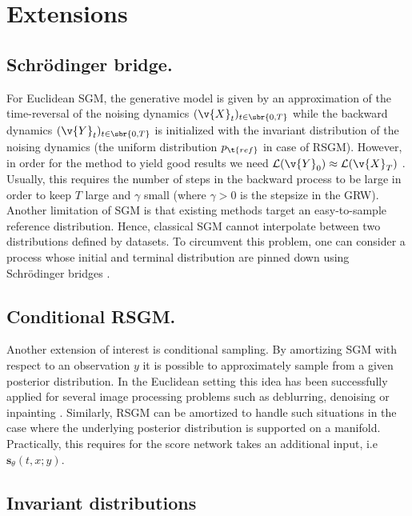 \section{Extensions} \label{sec:extensions}
\subsection{Schr\"odinger bridge.}
For Euclidean SGM, the generative model is given by an approximation of the time-reversal of the noising dynamics $(\v{X}_t)_{t \in \sbr{0,T}}$ while the backward dynamics $(\v{Y}_t)_{t \in \sbr{0,T}}$ is initialized with the invariant distribution of the noising dynamics (the uniform distribution $p_{\t{ref}}$ in case of RSGM).
However, in order for the method to yield good results we need $\mathcal{L}(\v{Y}_0) \approx \mathcal{L}(\v{X}_T)$ \cite[see][Theorem 1]{debortoli2021neurips}.
Usually, this requires the number of steps in the backward process to be large in order to keep $T$ large and $\gamma$ small (where $\gamma > 0$ is the stepsize in the GRW).
Another limitation of SGM is that existing methods target an easy-to-sample reference distribution.
Hence, classical SGM cannot interpolate between two distributions defined by datasets.
To circumvent this problem, one can consider a process whose initial and terminal distribution are pinned down using Schr\"odinger bridges \parencite{schrodinger1932theorie,leonard2012schrodinger,chen2016entropic,debortoli2021neurips,vargas2021solving}.
\subsection{Conditional RSGM.}
Another extension of interest is conditional sampling.
By amortizing SGM with respect to an observation $y$ it is possible to approximately sample from a given posterior distribution.
In the Euclidean setting this idea has been successfully applied for several image processing problems such as deblurring, denoising or inpainting \parencite[see for instance][]{kawar2021snips,kawar2021stochastic,lee2021priorgrad,sinha2021d2c,batzolis2021conditional,chung2021come}.
Similarly, RSGM can be amortized to handle such situations in the case where the underlying posterior distribution is supported on a manifold.
Practically, this requires for the score network takes an additional input, i.e\ $\mathbf{s}_\theta\left(t,x;y\right)$.

\subsection{Invariant distributions}

